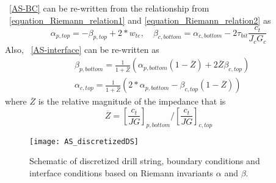 \equationname~\ref{AS-BC} can be re-written from the relationship from \equationname~\ref{equation_Riemann_relation1} and \ref{equation_Riemann_relation2} as
\begin{equation}\label{AS-riemannBC}
  \alpha_{p,top} = -\beta_{p,top} + 2*w_{te}, \quad \beta_{c,bottom} = \alpha_{c,bottom} - 2\tau_{bit} \frac{c_t}{J_c G_c}
\end{equation}
Also, \equationname~\ref{AS-interface} can be re-written as
\begin{equation}\label{AS-riemanninterface}
\begin{split}
    & \beta_{p,bottom} = \frac{1}{1+\overline{Z}}\left(\alpha_{p,bottom}(1-\overline{Z}) + 2\overline{Z}\beta_{c,top} \right) \\
    & \alpha_{c,top} = \frac{1}{1+\overline{Z}}\left(2*\alpha_{p,bottom} - \beta_{c,top}(1-\overline{Z})\right)
\end{split}
\end{equation}
where $\overline{Z}$ is the relative magnitude of the impedance that is
\begin{equation}\label{AS_Zbar}
  \overline{Z} = \left[\frac{c_t}{JG}\right]_{p,bottom} / \left[\frac{c_t}{JG}\right]_{c,top}
\end{equation}
\begin{figure}
  \centering
  \texttt{[image: AS\_discretizedDS]}
  \caption[Schematic of discretized drill string and boundary conditions]{Schematic of discretized drill string, boundary conditions and interface conditions based on Riemann invariants $\alpha$ and $\beta$.}\label{AS_discretizeDS}
\end{figure}

